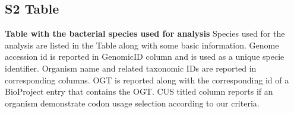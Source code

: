 \documentclass[10pt,letterpaper]{article}
\begin{document}
\subsection*{S2 Table}
\label{table:s2}
{\bf Table with the bacterial species used for analysis}
Species used for the analysis are listed in the Table along with some basic information.
Genome accession id is reported in GenomicID column and is used as a unique specie identifier.
Organism name and related taxonomic IDs are reported in corresponding columns.
OGT is reported along with the corresponding id of a BioProject entry that contains the OGT.
CUS titled column reports if an organism demonstrate codon usage selection according to our criteria.












% 
%
%
\end{document}
